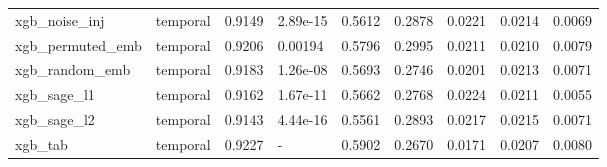 \begin{tabular}{lllllllll}
xgb\_noise\_inj & temporal & 0.9149 & 2.89e-15 & 0.5612 & 0.2878 & 0.0221 & 0.0214 & 0.0069 \\
xgb\_permuted\_emb & temporal & 0.9206 & 0.00194 & 0.5796 & 0.2995 & 0.0211 & 0.0210 & 0.0079 \\
xgb\_random\_emb & temporal & 0.9183 & 1.26e-08 & 0.5693 & 0.2746 & 0.0201 & 0.0213 & 0.0071 \\
xgb\_sage\_l1 & temporal & 0.9162 & 1.67e-11 & 0.5662 & 0.2768 & 0.0224 & 0.0211 & 0.0055 \\
xgb\_sage\_l2 & temporal & 0.9143 & 4.44e-16 & 0.5561 & 0.2893 & 0.0217 & 0.0215 & 0.0071 \\
xgb\_tab & temporal & 0.9227 & - & 0.5902 & 0.2670 & 0.0171 & 0.0207 & 0.0080 \\
\bottomrule
\end{tabular}
